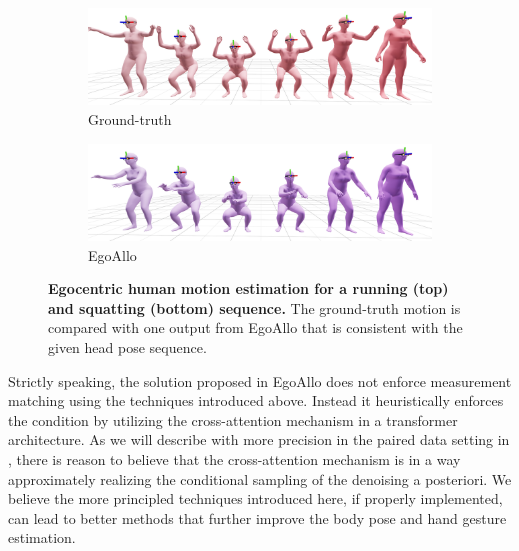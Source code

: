 \documentclass[../../book-main.tex]{subfiles}
\begin{document}
\begin{figure}[t]
\begin{subfigure}{0.45\textwidth}
  \centering
  \includegraphics[width=\linewidth]{figs_chap6/qual1_gt.png}
  \caption{\centering Ground-truth}
\end{subfigure}
\hfill
\begin{subfigure}{0.45\textwidth}
  \centering
  \includegraphics[width=\linewidth]{figs_chap6/qual1_ours.png}
  \caption{EgoAllo}
\end{subfigure}

\caption{
\textbf{Egocentric human motion estimation for a running (top) and squatting (bottom) sequence.}
The ground-truth motion is compared with one output from EgoAllo that is consistent with the given head pose sequence. 
}
\label{fig:comparison}
\end{figure}

Strictly speaking, the solution proposed in EgoAllo \cite{yi2024egoallo} does
not enforce measurement matching using the techniques introduced above. Instead
it heuristically enforces the condition by utilizing  the cross-attention
mechanism in a transformer architecture. As we will describe with more precision
in the paired data setting in , there is reason to believe that the
cross-attention mechanism is in a way approximately realizing the conditional
sampling of the denoising a posteriori. We believe the more principled
techniques introduced here, if properly implemented, can lead to better methods
that further improve the body pose and hand gesture estimation. 
\end{document}
